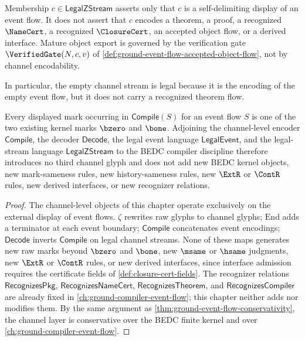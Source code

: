 \begin{principle}
\label{prin:channel-encoding-not-theoremhood}
Membership $c \in \mathsf{LegalZStream}$ asserts only that $c$ is a self-delimiting display of an event flow. It does not assert that $c$ encodes a theorem, a proof, a recognized $\NameCert$, a recognized $\ClosureCert$, an accepted object flow, or a derived interface. Mature object export is governed by the verification gate $\VerifiedGate(N, c, v)$ of \autoref{def:ground-event-flow-accepted-object-flow}, not by channel encodability.

In particular, the empty channel stream is legal because it is the encoding of the empty event flow, but it does not carry a recognized theorem flow.
\end{principle}

\begin{theorem}
\label{thm:channel-encoding-conservativity}
Every displayed mark occurring in $\mathsf{Compile}(S)$ for an event flow $S$ is one of the two existing kernel marks $\bzero$ and $\bone$. Adjoining the channel-level encoder $\mathsf{Compile}$, the decoder $\mathsf{Decode}$, the legal event language $\mathsf{LegalEvent}$, and the legal-stream language $\mathsf{LegalZStream}$ to the BEDC compiler discipline therefore introduces no third channel glyph and does not add new BEDC kernel objects, new mark-sameness rules, new history-sameness rules, new $\ExtR$ or $\ContR$ rules, new derived interfaces, or new recognizer relations.
\end{theorem}

\begin{proof}
The channel-level objects of this chapter operate exclusively on the external display of event flows. $\zeta$ rewrites raw glyphs to channel glyphs; $\mathrm{End}$ adds a terminator at each event boundary; $\mathsf{Compile}$ concatenates event encodings; $\mathsf{Decode}$ inverts $\mathsf{Compile}$ on legal channel streams. None of these maps generates new raw marks beyond $\bzero$ and $\bone$, new $\msame$ or $\hsame$ judgments, new $\ExtR$ or $\ContR$ rules, or new derived interfaces, since interface admission requires the certificate fields of \autoref{def:closure-cert-fields}. The recognizer relations $\mathsf{RecognizesPkg}$, $\mathsf{RecognizesNameCert}$, $\mathsf{RecognizesTheorem}$, and $\mathsf{RecognizesCompiler}$ are already fixed in \autoref{ch:ground-compiler-event-flow}; this chapter neither adds nor modifies them. By the same argument as \autoref{thm:ground-event-flow-conservativity}, the channel layer is conservative over the BEDC finite kernel and over \autoref{ch:ground-compiler-event-flow}.
\end{proof}

